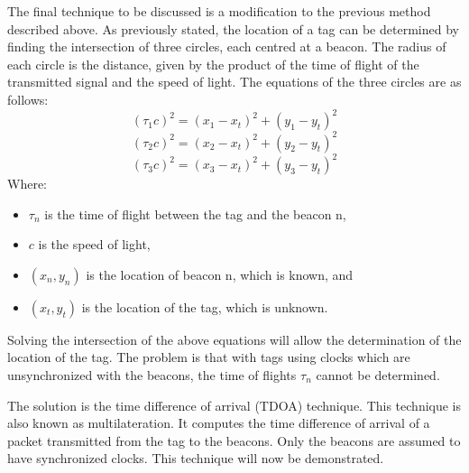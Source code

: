 The final technique to be discussed is a modification to the previous method described above. As previously stated, the location of a tag can be determined by finding the intersection of three circles, each centred at a beacon. The radius of each circle is the distance, given by the product of the time of flight of the transmitted signal and the speed of light. The equations of the three circles are as follows\cite{gaffney}:
$$(\tau_1 c)^2 = (x_1-x_t)^2 + (y_1-y_t)^2$$
$$(\tau_2 c)^2 = (x_2-x_t)^2 + (y_2-y_t)^2$$
$$(\tau_3 c)^2 = (x_3-x_t)^2 + (y_3-y_t)^2$$
Where:
\begin{itemize}
\item $\tau_n$ is the time of flight between the tag and the beacon n,
\item $c$ is the speed of light,
\item $(x_n,y_n)$ is the location of beacon n, which is known, and
\item $(x_t,y_t)$ is the location of the tag, which is unknown.
\end{itemize}
Solving the intersection of the above equations will allow the determination of the location of the tag. The problem is that with tags using clocks which are unsynchronized with the beacons, the time of flights $\tau_n$ cannot be determined.

The solution is the time difference of arrival (TDOA) technique. This technique is also known as multilateration. It computes the time difference of arrival of a packet transmitted from the tag to the beacons. Only the beacons are assumed to have synchronized clocks. This technique will now be demonstrated.

